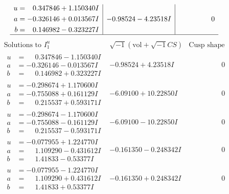 \documentclass[1p]{elsarticle_modified}
\theoremstyle{definition}
\newcommand{\I}{\sqrt{-1}}
\begin{document}
$$\begin{array}{c|c|c}
\begin{aligned}
u &= \phantom{-}0.347846 + 1.150340 I \\
a &= -0.326146 + 0.013567 I \\
b &= \phantom{-}0.146982 - 0.323227 I\end{aligned}
 & -0.98524 - 4.23518 I & \phantom{-0.000000 } 0\\
 \hline 
 \end{array}$$\newpage$$\begin{array}{c|c|c}  
\text{Solutions to }I^u_{1}& \I (\text{vol} + \sqrt{-1}CS) & \text{Cusp shape}\\
 \hline 
\begin{aligned}
u &= \phantom{-}0.347846 - 1.150340 I \\
a &= -0.326146 - 0.013567 I \\
b &= \phantom{-}0.146982 + 0.323227 I\end{aligned}
 & -0.98524 + 4.23518 I & \phantom{-0.000000 } 0 \\ \hline\begin{aligned}
u &= -0.298674 + 1.170600 I \\
a &= -0.755088 + 0.161129 I \\
b &= \phantom{-}0.215537 + 0.593171 I\end{aligned}
 & -6.09100 + 10.22850 I & \phantom{-0.000000 } 0 \\ \hline\begin{aligned}
u &= -0.298674 - 1.170600 I \\
a &= -0.755088 - 0.161129 I \\
b &= \phantom{-}0.215537 - 0.593171 I\end{aligned}
 & -6.09100 - 10.22850 I & \phantom{-0.000000 } 0 \\ \hline\begin{aligned}
u &= -0.077955 + 1.224770 I \\
a &= \phantom{-}1.109290 - 0.431612 I \\
b &= \phantom{-}1.41833 - 0.53377 I\end{aligned}
 & -0.161350 - 0.248342 I & \phantom{-0.000000 } 0 \\ \hline\begin{aligned}
u &= -0.077955 - 1.224770 I \\
a &= \phantom{-}1.109290 + 0.431612 I \\
b &= \phantom{-}1.41833 + 0.53377 I\end{aligned}
 & -0.161350 + 0.248342 I & \phantom{-0.000000 } 0 \\ \hline\begin{aligned}

\end{aligned}
\end{array}$$
\end{document}

